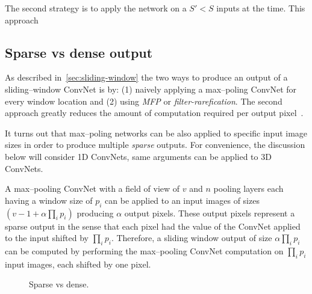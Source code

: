 \documentclass[conference]{IEEEtran}
\begin{document}
  The second strategy is to apply the network on a $S' < S$ inputs at
  the time.  This approach

\subsection{Sparse vs dense output}

  As described in~\ref{sec:sliding-window} the two ways to produce an
  output of a sliding--window ConvNet is by: (1) naively applying a
  max--poling ConvNet for every window location and (2) using
  \emph{MFP} or \emph{filter-rarefication}.
  The second approach greatly reduces the amount of computation
  required per output pixel~\cite{giusti2013fast,masci2013fast,
    zlateski2015znn,long2015fully,sermanet2013overfeat,yu2015multi}.

  It turns out that max--poling networks can be also applied to
  specific input image sizes in order to produce multiple
  \emph{sparse} outputs.  For convenience, the discussion below will
  consider 1D ConvNets, same arguments can be applied to 3D ConvNets.

  A max--pooling ConvNet with a field of view of $v$ and $n$ pooling
  layers each having a window size of $p_i$ can be applied to an input
  images of sizes $(v - 1 + \alpha \prod_{i} p_i)$ producing $\alpha$
  output pixels.  These output pixels represent a sparse output in the
  sense that each pixel had the value of the ConvNet applied to the
  input shifted by $\prod_{i} p_i$.  Therefore, a sliding window
  output of size $\alpha \prod_{i} p_i$ can be computed by performing
  the max--pooling ConvNet computation on $\prod_{i} p_i$ input
  images, each shifted by one pixel.

  \begin{figure}
    \centering
    \caption{Sparse vs dense.}
    \label{fig:sparse_explanation}
  \end{figure}
\end{document}
